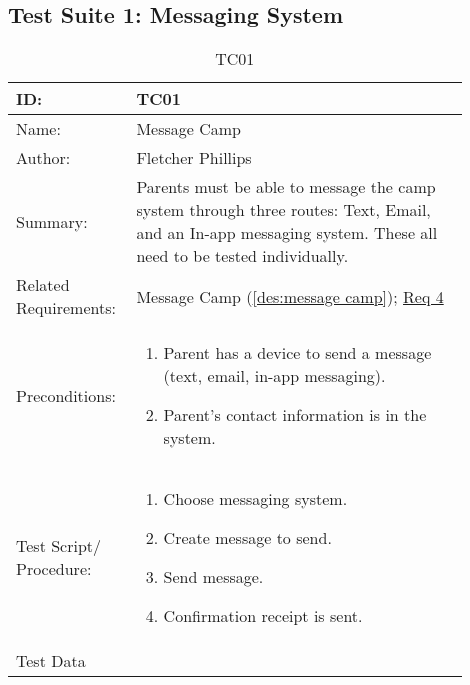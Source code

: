 \documentclass[11pt]{article}
\begin{document}

\clearpage

\subsection*{Test Suite 1: Messaging System}

\begin{table}[H]
\begin{center}
\caption{TC01}
\label{TC01}
\begin{tabular}{p{0.20\linewidth}p{0.70\linewidth}}
	ID: & TC01\\\hline
	Name: & Message Camp \\\hline
	Author: & Fletcher Phillips\\\hline
	Summary: &  Parents must be able to message the camp system through three routes: Text, Email, and an In-app messaging system. These all need to be tested individually.\\\hline
	Related \hspace{5em} Requirements:& Message Camp (\cref{des:message camp}); \hyperlink{Req4}{Req 4} \\\hline
	Preconditions:& \begin{enumerate}[topsep=0pt]
		\item Parent has a device to send a message (text, email, in-app messaging).
		\item Parent's contact information is in the system.
	\end{enumerate}\\\hline
	Test Script/ Procedure: & \begin{enumerate}[topsep=0pt]
		\item Choose messaging system.
		\item Create message to send.
		\item Send message.
		\item Confirmation receipt is sent.
	\end{enumerate}\\\hline
	Test Data & 
\end{tabular}
\end{center}
\end{table}
\end{document}
